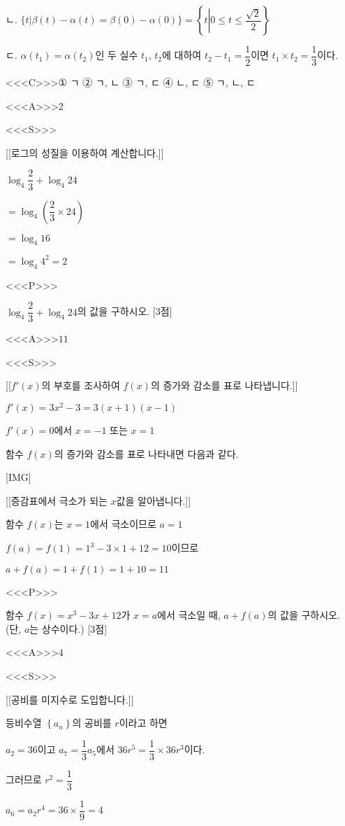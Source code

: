 \documentclass{oblivoir}
\begin{document}
ㄴ. $\{t |\beta(t)-\alpha(t)=\beta(0)-\alpha(0)\}=\left\{ t \left | 0\le t \le \dfrac{\sqrt{2}}{2} \right. \right\}$

ㄷ. $\alpha\left(t_{1}\right)=\alpha\left(t_{2}\right)$인 두 실수 $t_{1}$, $t_{2}$에 대하여
$t_{2}-t_{1}=\dfrac{1}{2}$이면 $t_{1}\times t_{2}=\dfrac{1}{3}$이다.

<<<C>>>① ㄱ           ② ㄱ, ㄴ        ③ ㄱ, ㄷ ④ ㄴ, ㄷ ⑤ ㄱ, ㄴ, ㄷ

<<<A>>>$2$

<<<S>>>

[[로그의 성질을 이용하여 계산합니다.]]

$\log_{4}\dfrac{2}{3}+\log_{4}24$

$=\log_{4}\left(\dfrac{2}{3}\times 24\right)$

$=\log_{4}16$

$=\log_{4}4^{2}=2$

<<<P>>>

$\log_{4}\dfrac{2}{3}+\log_{4}24$의 값을 구하시오. [3점]

<<<A>>>$11$

<<<S>>>

[[$f'(x)$의 부호를 조사하여 $f(x)$의 증가와 감소를 표로 나타냅니다.]]

$f'(x)=3x^{2}-3=3(x+1)(x-1)$

$f'(x)=0$에서 $x=-1$ 또는 $x=1$

함수 $f(x)$의 증가와 감소를 표로 나타내면 다음과 같다.

[IMG]

[[증감표에서 극소가 되는 $x$값을 알아냅니다.]]

함수 $f(x)$는 $x=1$에서 극소이므로 $a=1$

$f(a)=f(1)=1^{3}-3\times 1+12=10$이므로

$a+f(a)=1+f(1)=1+10=11$

<<<P>>>

함수 $f(x)=x^{3}-3x+12$가 $x=a$에서 극소일 때, $a+f(a)$의 값을 구하시오. (단, $a$는 상수이다.) [3점]

<<<A>>>$4$

<<<S>>>

[[공비를 미지수로 도입합니다.]]

등비수열 $\left\{a_{n}\right\}$의 공비를 $r$이라고 하면 

$a_{2}=36$이고 $a_{7}=\dfrac{1}{3}a_{5}$에서 $36r^{5}=\dfrac{1}{3}\times 36r^{3}$이다. 

그러므로 $r^{2}=\dfrac{1}{3}$

$a_{6}=a_{2}r^{4}=36\times\dfrac{1}{9}=4$
\end{document}
